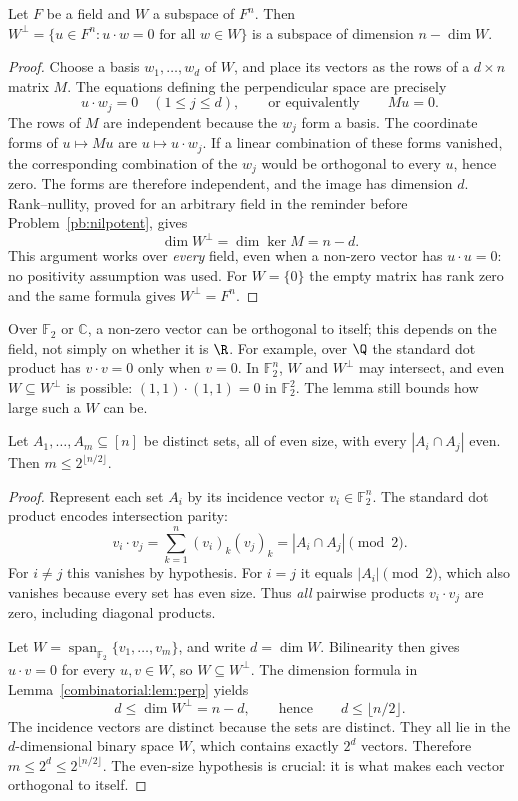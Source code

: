 \begin{lemma}\label{combinatorial:lem:perp}
Let $F$ be a field and $W$ a subspace of $F^n$. Then $W^\perp=\{u\in F^n:u\cdot w=0\text{ for all }w\in W\}$ is a subspace of dimension $n-\dim W$.
\end{lemma}
\begin{proof}
Choose a basis $w_1,\ldots,w_d$ of $W$, and place its vectors
as the rows of a $d\times n$ matrix $M$. The equations defining
the perpendicular space are precisely
\[
u\cdot w_j=0\quad(1\le j\le d),
\qquad\text{or equivalently}\qquad Mu=0.
\]
The rows of $M$ are independent because the $w_j$ form a basis.
The coordinate forms of $u\mapsto Mu$ are $u\mapsto u\cdot w_j$. If a linear combination of these forms vanished, the corresponding combination of the $w_j$ would be orthogonal to every $u$, hence zero. The forms are therefore independent, and the image has dimension $d$. Rank--nullity, proved for an arbitrary field in the reminder before Problem~\ref{pb:nilpotent}, gives
\[
\dim W^\perp=\dim\ker M=n-d.
\]
This argument works over \emph{every} field, even when a non-zero
vector has $u\cdot u=0$: no positivity assumption was used.
For $W=\{0\}$ the empty matrix has rank zero and the same
formula gives $W^\perp=F^n$.
\end{proof}

Over $\mathbb F_2$ or $\mathbb C$, a non-zero vector can be orthogonal to itself; this depends on the field, not simply on whether it is $\R$. For example, over $\Q$ the standard dot product has $v\cdot v=0$ only when $v=0$. In $\mathbb F_2^n$, $W$ and $W^\perp$ may intersect, and even
$W\subseteq W^\perp$ is possible: $(1,1)\cdot(1,1)=0$ in $\mathbb F_2^2$. The lemma still bounds how large such a $W$ can be.

\begin{theorem}\label{combinatorial:thm:eventown}
Let $A_1,\dots,A_m\subseteq[n]$ be distinct sets, all of even size, with every $|A_i\cap A_j|$ even. Then $m\le2^{\lfloor n/2\rfloor}$.
\end{theorem}
\begin{proof}
Represent each set $A_i$ by its incidence vector
$v_i\in\mathbb F_2^n$. The standard dot product
encodes intersection parity:
\[
v_i\cdot v_j
=\sum_{k=1}^n (v_i)_k(v_j)_k
=|A_i\cap A_j|\pmod2.
\]
For $i\ne j$ this vanishes by hypothesis.
For $i=j$ it equals $|A_i|\pmod2$, which
also vanishes because every set has even size.
Thus \emph{all} pairwise products
$v_i\cdot v_j$ are zero, including diagonal
products.

Let $W=\operatorname{span}_{\mathbb F_2}
\{v_1,\ldots,v_m\}$, and write $d=\dim W$.
Bilinearity then gives $u\cdot v=0$
for every $u,v\in W$, so $W\subseteq W^\perp$.
The dimension formula in
Lemma~\ref{combinatorial:lem:perp} yields
\[
d\le\dim W^\perp=n-d,
\qquad\text{hence}\qquad d\le\lfloor n/2\rfloor.
\]
The incidence vectors are distinct because
the sets are distinct. They all lie in the
$d$-dimensional binary space $W$, which contains
exactly $2^d$ vectors. Therefore
$m\le2^d\le2^{\lfloor n/2\rfloor}$.
The even-size hypothesis is crucial: it is
what makes each vector orthogonal to itself.
\end{proof}


